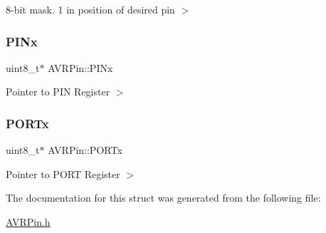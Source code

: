 8-\/bit mask. 1 in position of desired pin $>$ \mbox{\label{struct_a_v_r_pin_a79484fa0ab59addfe52792d1af2bd783}} 
\subsubsection{\texorpdfstring{P\+I\+Nx}{PINx}}
{\footnotesize\ttfamily uint8\+\_\+t$\ast$ A\+V\+R\+Pin\+::\+P\+I\+Nx}

Pointer to P\+IN Register $>$ \mbox{\label{struct_a_v_r_pin_a1199bc37a19e3683ccce8e1baa3969ed}} 
\subsubsection{\texorpdfstring{P\+O\+R\+Tx}{PORTx}}
{\footnotesize\ttfamily uint8\+\_\+t$\ast$ A\+V\+R\+Pin\+::\+P\+O\+R\+Tx}

Pointer to P\+O\+RT Register $>$ 

The documentation for this struct was generated from the following file\+:\begin{DoxyCompactItemize}
\item 
\mbox{\hyperlink{_a_v_r_pin_8h}{A\+V\+R\+Pin.\+h}}\end{DoxyCompactItemize}
